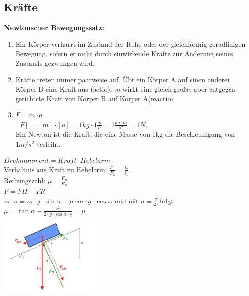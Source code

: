 \documentclass[eglish/german]{latex4ei/latex4ei_sheet}
\begin{document}
			\begin{sectionbox}
				\subsection{Kräfte}
				\textbf{Newtonscher Bewegungssatz:}
				\begin{enumerate}
					\item 	Ein Körper verharrt im Zustand der Ruhe oder der gleichförmig geradlinigen Bewegung, sofern er nicht durch einwirkende Kräfte zur Änderung seines Zustands gezwungen wird.
					\item 	Kräfte treten immer paarweise auf. Übt ein Körper A auf einen anderen Körper B eine Kraft aus (actio), 
							so wirkt eine gleich große, aber entgegen gerichtete Kraft von Körper B auf Körper A(reactio)
					\item 	$F = m \cdot a$\\
							$[F] = [m] \cdot [a] = 1 kg \cdot 1\frac{m}{s^2}= 1\frac{kg \cdot m}{s^2} = 1N$.\\
							Ein Newton ist die Kraft, die eine Masse von 1kg die Beschleunigung von $1m/s^2$ verleiht.\\

				\end{enumerate}
				

				$Drehmonment = Kraft \cdot Hebelarm$\\
				Verhältnis aus Kraft zu Hebelarm: $ \frac{F_1}{F_2} = \frac{l_2}{l_1}$.\\

				Reibungszahl: $\mu = \frac{F_R}{F_N}$\\
				
				$F=FH-FR$\\ 
				$m\cdot a=m\cdot g\cdot \sin \alpha-\mu\cdot m\cdot g\cdot \cos \alpha$ und mit $a=\frac{v^2}{2 \cdot }$folgt:\\
				$\mu=\tan \alpha-\frac{v^2}{2\cdot g\cdot \cos \alpha \cdot s}= \mu$\\
				\includegraphics[width=50mm]{img/Schiefe_ebene_4.png}\\

			\end{sectionbox}
\end{document}
